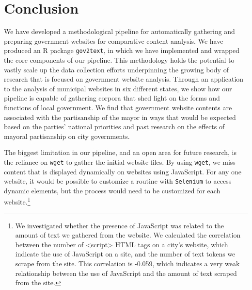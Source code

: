 \documentclass[11pt]{article}
\begin{document}
\section{Conclusion}


We have developed a methodological pipeline for automatically gathering and preparing government websites for comparative content analysis. We have produced an R package \texttt{gov2text}, in which we have implemented and wrapped the core components of our pipeline. This methodology holds the potential to vastly scale up the data collection efforts underpinning the growing body of research that is focused on government website analysis. Through an application to the analysis of municipal websites in six different states, we show how our pipeline is capable of gathering corpora that shed light on the forms and functions of local government. We find that government website contents are associated with the partisanship of the mayor in ways that would be expected based on the parties' national priorities and past research on the effects of mayoral partisanship on city governments.

The biggest limitation in our pipeline, and an open area for future research, is the reliance on \texttt{wget} to gather the initial website files. By using \texttt{wget}, we miss content that is displayed dynamically on websites using JavaScript. For any one website, it would be possible to customize a routine with \texttt{Selenium} to access dynamic elements, but the process would need to be customized for each website.\footnote{ We investigated whether the presence of JavaScript was related to the amount of text we gathered from the website. We calculated the correlation between the number of <script> HTML tags on a city's website, which indicate the use of JavaScript on a site, and the number of text tokens we scrape from the site. This correlation is -0.059, which indicates a very weak relationship between the use of JavaScript and the amount of text scraped from the site.}



%
%

%

\end{document}
